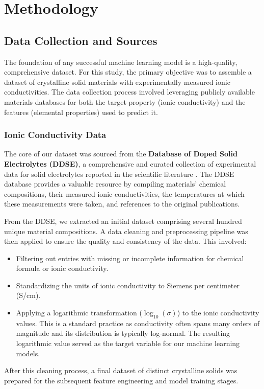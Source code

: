 \chapter{Methodology}

\section{Data Collection and Sources}

The foundation of any successful machine learning model is a high-quality, comprehensive dataset. For this study, the primary objective was to assemble a dataset of crystalline solid materials with experimentally measured ionic conductivities. The data collection process involved leveraging publicly available materials databases for both the target property (ionic conductivity) and the features (elemental properties) used to predict it.

\subsection{Ionic Conductivity Data}

The core of our dataset was sourced from the \textbf{Database of Doped Solid Electrolytes (DDSE)}, a comprehensive and curated collection of experimental data for solid electrolytes reported in the scientific literature \cite{DDSE2021}. The DDSE database provides a valuable resource by compiling materials' chemical compositions, their measured ionic conductivities, the temperatures at which these measurements were taken, and references to the original publications.

From the DDSE, we extracted an initial dataset comprising several hundred unique material compositions. A data cleaning and preprocessing pipeline was then applied to ensure the quality and consistency of the data. This involved:
\begin{itemize}
    \item Filtering out entries with missing or incomplete information for chemical formula or ionic conductivity.
    \item Standardizing the units of ionic conductivity to Siemens per centimeter (S/cm).
    \item Applying a logarithmic transformation (\(\log_{10}(\sigma)\)) to the ionic conductivity values. This is a standard practice as conductivity often spans many orders of magnitude and its distribution is typically log-normal. The resulting logarithmic value served as the target variable for our machine learning models.
\end{itemize}
After this cleaning process, a final dataset of distinct crystalline solids was prepared for the subsequent feature engineering and model training stages.

